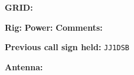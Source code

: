 \documentclass{article}
\begin{document}
\vfill

\footnotesize \textbf{GRID:}
\vfill

\footnotesize \textbf{Rig:} \makebox[0.3\textwidth]{} \textbf{Power:} \makebox[0.1\textwidth]{} \textbf{Comments:}

\vfill

\footnotesize \textbf{Previous call sign held:} \texttt{JJ1DSB}

\vfill

\textbf{Antenna:} \makebox[1cm]{}

\vfill

\tiny
\end{document}
